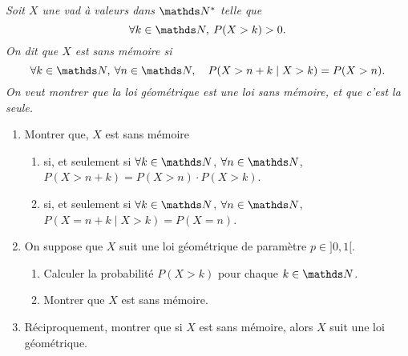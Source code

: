 \begin{exo}
  \slshape
  Soit $X$\/ une \textup{vad} à valeurs dans $\N^*$\/ telle que \[
    \forall k \in \N,\: P(X > k) > 0
  .\] On dit que $X$\/ est \textit{sans mémoire} si \[
    \forall k \in \N,\: \forall n \in \N,\quad P(X >n + k  \mid X > k) = P(X > n)
  .\] On veut montrer que la loi géométrique est une loi sans mémoire, et que c'est la seule.
  
  \begin{enumerate}
    \item Montrer que, $X$\/ est sans mémoire
      \begin{enumerate}
        \item si, et seulement si $\forall k \in \N$, $\forall n \in \N$, $P(X > n + k) = P(X > n) \cdot P(X > k)$.
        \item si, et seulement si $\forall k \in \N$, $\forall n \in \N$, $P(X = n + k  \mid X > k) = P(X = n)$.
      \end{enumerate}
    \item On suppose que $X$\/ suit une loi géométrique de paramètre $p \in {]0,1[}$.
      \begin{enumerate}
        \item Calculer la probabilité $P(X > k)$\/ pour chaque $k \in \N$.
        \item Montrer que $X$\/ est sans mémoire.
      \end{enumerate}
    \item Réciproquement, montrer que si $X$ est sans mémoire, alors $X$\/ suit une loi géométrique.
  \end{enumerate}
  \upshape


\end{exo}
